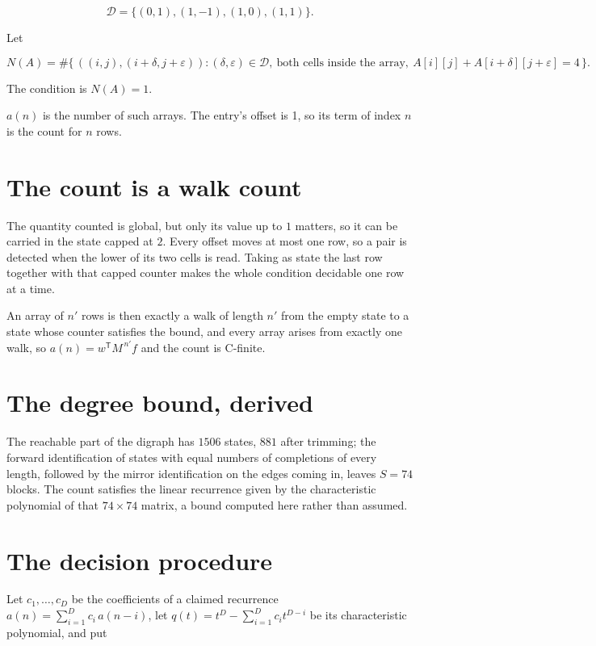 \documentclass[11pt]{article}
\theoremstyle{definition}
\begin{document}
\[\mathcal{D} = \{(0,1), (1,-1), (1,0), (1,1)\}.\]

Let

\[N(A) = \#\bigl\{\,((i,j),(i{+}\delta,j{+}\varepsilon)) : (\delta,\varepsilon) \in \mathcal{D},\ \text{both cells inside the array},\ A[i][j] + A[i{+}\delta][j{+}\varepsilon] = 4\,\bigr\}.\]

The condition is $N(A) = 1$.

$a(n)$ is the number of such arrays. The entry's offset is 1, so its term of index $n$ is the count for $n$ rows.

\section{The count is a walk count}

The quantity counted is global, but only its value up to $1$ matters, so it can be carried in the state capped at $2$. Every offset moves at most one row, so a pair is detected when the lower of its two cells is read. Taking as state the last row together with that capped counter makes the whole condition decidable one row at a time.

An array of $n'$ rows is then exactly a walk of length $n'$ from the empty state to a state whose counter satisfies the bound, and every array arises from exactly one walk, so $a(n) = w^{\mathsf T}M^{\,n'}f$ and the count is C-finite.

\section{The degree bound, derived}

The reachable part of the digraph has $1506$ states, $881$ after trimming; the forward identification of states with equal numbers of completions of every length, followed by the mirror identification on the edges coming in, leaves $S = 74$ blocks. The count satisfies the linear recurrence given by the characteristic polynomial of that $74\times74$ matrix, a bound computed here rather than assumed.

\section{The decision procedure}

Let $c_1,\dots,c_D$ be the coefficients of a claimed recurrence $a(n) = \sum_{i=1}^{D} c_i\,a(n-i)$, let $q(t) = t^{D} - \sum_{i=1}^{D} c_i t^{D-i}$ be its characteristic polynomial, and put
\end{document}

